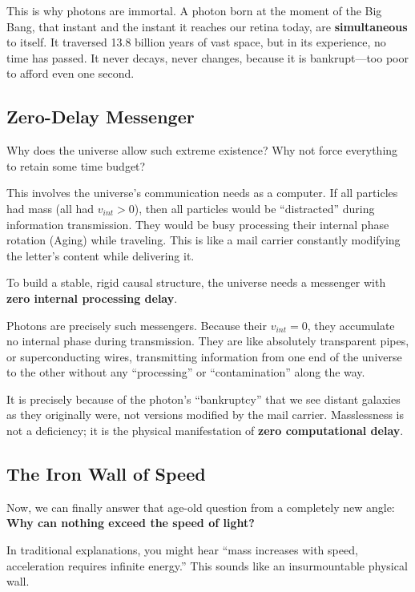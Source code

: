 This is why photons are immortal. A photon born at the moment of the Big Bang, that instant and the instant it reaches our retina today, are \textbf{simultaneous} to itself. It traversed 13.8 billion years of vast space, but in its experience, no time has passed. It never decays, never changes, because it is bankrupt---too poor to afford even one second.

\subsection{Zero-Delay Messenger}

Why does the universe allow such extreme existence? Why not force everything to retain some time budget?

This involves the universe's communication needs as a computer. If all particles had mass (all had $v_{int} > 0$), then all particles would be ``distracted'' during information transmission. They would be busy processing their internal phase rotation (Aging) while traveling. This is like a mail carrier constantly modifying the letter's content while delivering it.

To build a stable, rigid causal structure, the universe needs a messenger with \textbf{zero internal processing delay}.

Photons are precisely such messengers. Because their $v_{int}=0$, they accumulate no internal phase during transmission. They are like absolutely transparent pipes, or superconducting wires, transmitting information from one end of the universe to the other without any ``processing'' or ``contamination'' along the way.

It is precisely because of the photon's ``bankruptcy'' that we see distant galaxies as they originally were, not versions modified by the mail carrier. Masslessness is not a deficiency; it is the physical manifestation of \textbf{zero computational delay}.

\subsection{The Iron Wall of Speed}

Now, we can finally answer that age-old question from a completely new angle: \textbf{Why can nothing exceed the speed of light?}

In traditional explanations, you might hear ``mass increases with speed, acceleration requires infinite energy.'' This sounds like an insurmountable physical wall.


